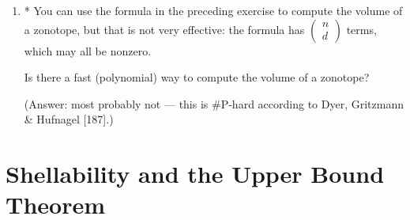 \documentclass{article}
\begin{document}
\begin{enumerate}
\item * You can use the formula in the preceding exercise to compute the volume of a zonotope, but that is not very effective: the formula has
$\begin{pmatrix} n \\ d \end{pmatrix}$ terms, which may all be nonzero.

Is there a fast (polynomial) way to compute the volume of a zonotope?

(Answer: most probably not --- this is \#P-hard according to Dyer, Gritzmann \& Hufnagel [187].)

\end{enumerate}

\bigskip
\section{Shellability and the Upper Bound Theorem}
\end{document}

